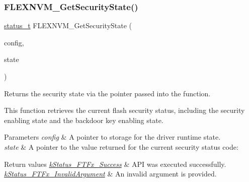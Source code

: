 \subsubsection{\texorpdfstring{FLEXNVM\_GetSecurityState()}{FLEXNVM\_GetSecurityState()}}
{\footnotesize\ttfamily \mbox{\hyperlink{group__ksdk__common_gaaabdaf7ee58ca7269bd4bf24efcde092}{status\+\_\+t}} F\+L\+E\+X\+N\+V\+M\+\_\+\+Get\+Security\+State (\begin{DoxyParamCaption}\item[{\mbox{\hyperlink{group__ftfx__flexnvm__driver_ga8fd4d473c0a4b30cac163160fb28a6c1}{flexnvm\+\_\+config\+\_\+t}} $\ast$}]{config,  }\item[{\mbox{\hyperlink{group__ftfx__controller_gae49df85d158f3651e17d1bb660a4f1c2}{ftfx\+\_\+security\+\_\+state\+\_\+t}} $\ast$}]{state }\end{DoxyParamCaption})}



Returns the security state via the pointer passed into the function. 

This function retrieves the current flash security status, including the security enabling state and the backdoor key enabling state.


\begin{DoxyParams}{Parameters}
{\em config} & A pointer to storage for the driver runtime state. \\
\hline
{\em state} & A pointer to the value returned for the current security status code\+:\\
\hline
\end{DoxyParams}

\begin{DoxyRetVals}{Return values}
{\em \mbox{\hyperlink{group__ftfx__controller_gga458e651af6690959efa2afb96be7d609a8825e5cb3b30edfd6a26897eef4c66a3}{k\+Status\+\_\+\+F\+T\+Fx\+\_\+\+Success}}} & A\+PI was executed successfully. \\
\hline
{\em \mbox{\hyperlink{group__ftfx__controller_gga458e651af6690959efa2afb96be7d609a88aadd667559399a26dcb825bf0b8d3e}{k\+Status\+\_\+\+F\+T\+Fx\+\_\+\+Invalid\+Argument}}} & An invalid argument is provided. \\
\hline
\end{DoxyRetVals}
\mbox{\label{group__ftfx__flexnvm__driver_gac07ad15ba63f1ec86217eeb8c2df3520}} 
